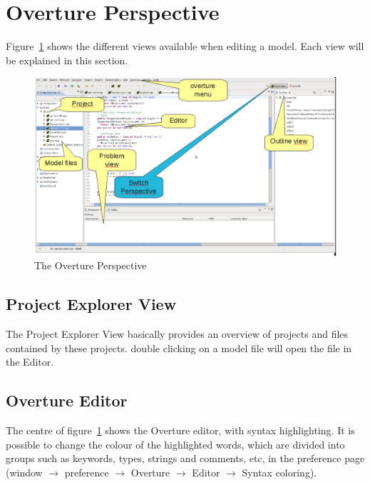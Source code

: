 \section{Overture Perspective}

Figure~\ref{fig:userguire:OverturePerspective} shows the different views
available when editing a model. Each view will be explained in this section.  

\begin{figure}[!h]
\begin{center}
  \includegraphics[clip,scale=0.6]{figures/OverturePerspective}
  \caption[labelInTOC]{The Overture Perspective}
  \label{fig:userguire:OverturePerspective}
\end{center}
\end{figure}

\subsection{Project Explorer View}

The Project Explorer View basically provides an overview of projects and
files contained by these projects. double clicking on a model file will open
the file in the Editor.

\subsection{Overture Editor}

The centre of  figure~\ref{fig:userguire:OverturePerspective} shows the Overture
editor, with syntax highlighting. It is possible to change the colour of the
highlighted words, which are divided into groups such as keywords, types, strings
and comments, etc, in the preference page (window $ \rightarrow $ preference $ \rightarrow $
Overture $ \rightarrow $ Editor $ \rightarrow $ Syntax coloring).

